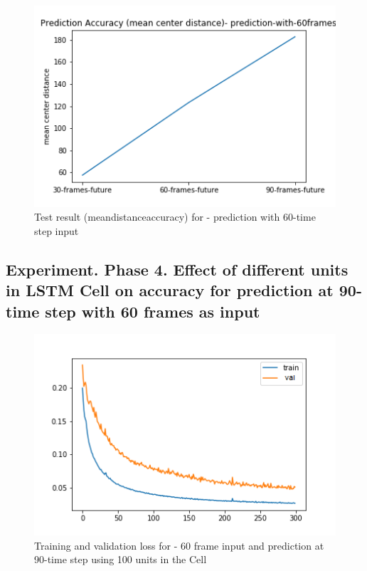 \begin{figure}[H] 
\includegraphics[scale=0.7]{prediction-with-60frames-mean_distance_accuracy}
\begin{center}
\caption{Test result (mean\textunderscore distance\textunderscore accuracy) for - prediction with 60-time step
 input }
\label{60-mcd}
\end{center}
\end{figure}

\subsection{Experiment. Phase 4. Effect of different units in LSTM Cell on accuracy for prediction at 90-time step with 60 frames as input}

\begin{figure}[H] 
\includegraphics[scale=0.7]{conf14_300e_60_90ffuture_100unit}
\begin{center}
\caption{Training and validation loss for - 60 frame input and prediction at 90-time step using 100 units in the Cell}
\label{60-90-100unit}
\end{center}
\end{figure}

